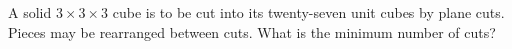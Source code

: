 A solid $3\times3\times3$ cube is to be cut into its twenty-seven unit cubes by plane cuts. Pieces may be rearranged between cuts. What is the minimum number of cuts?

